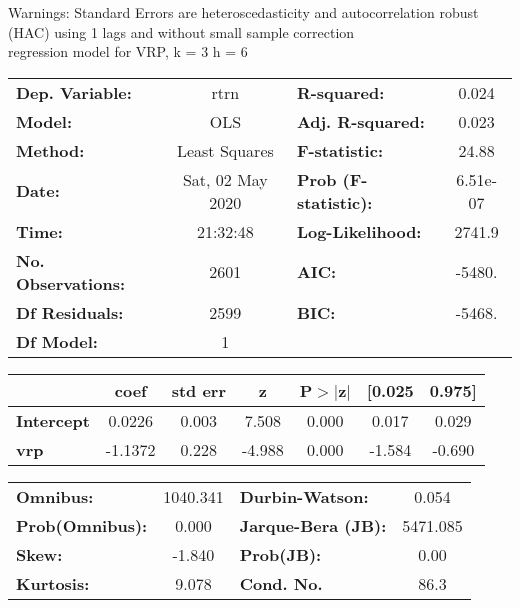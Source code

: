 Warnings: \newline
 [1] Standard Errors are heteroscedasticity and autocorrelation robust (HAC) using 1 lags and without small sample correction\\ 

regression model for VRP, k = 3 h = 6\begin{center}
\begin{tabular}{lclc}
\toprule
\textbf{Dep. Variable:}    &       rtrn       & \textbf{  R-squared:         } &     0.024   \\
\textbf{Model:}            &       OLS        & \textbf{  Adj. R-squared:    } &     0.023   \\
\textbf{Method:}           &  Least Squares   & \textbf{  F-statistic:       } &     24.88   \\
\textbf{Date:}             & Sat, 02 May 2020 & \textbf{  Prob (F-statistic):} &  6.51e-07   \\
\textbf{Time:}             &     21:32:48     & \textbf{  Log-Likelihood:    } &    2741.9   \\
\textbf{No. Observations:} &        2601      & \textbf{  AIC:               } &    -5480.   \\
\textbf{Df Residuals:}     &        2599      & \textbf{  BIC:               } &    -5468.   \\
\textbf{Df Model:}         &           1      & \textbf{                     } &             \\
\bottomrule
\end{tabular}
\begin{tabular}{lcccccc}
                   & \textbf{coef} & \textbf{std err} & \textbf{z} & \textbf{P$> |$z$|$} & \textbf{[0.025} & \textbf{0.975]}  \\
\midrule
\textbf{Intercept} &       0.0226  &        0.003     &     7.508  &         0.000        &        0.017    &        0.029     \\
\textbf{vrp}       &      -1.1372  &        0.228     &    -4.988  &         0.000        &       -1.584    &       -0.690     \\
\bottomrule
\end{tabular}
\begin{tabular}{lclc}
\textbf{Omnibus:}       & 1040.341 & \textbf{  Durbin-Watson:     } &    0.054  \\
\textbf{Prob(Omnibus):} &   0.000  & \textbf{  Jarque-Bera (JB):  } & 5471.085  \\
\textbf{Skew:}          &  -1.840  & \textbf{  Prob(JB):          } &     0.00  \\
\textbf{Kurtosis:}      &   9.078  & \textbf{  Cond. No.          } &     86.3  \\
\bottomrule
\end{tabular}
\end{center}

